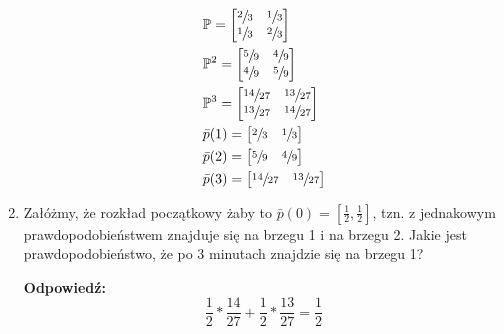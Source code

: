 \begin{enumerate}[label=\alph*)]
\begin{multicols}{2}
\begin{align*}
&\mathbb{P}=\begin{bmatrix}
\sfrac{2}{3}&\sfrac{1}{3}\\
\sfrac{1}{3}&\sfrac{2}{3}
\end{bmatrix}\\
&\mathbb{P}^2=\begin{bmatrix}
\sfrac{5}{9}&\sfrac{4}{9}\\
\sfrac{4}{9}&\sfrac{5}{9}
\end{bmatrix}\\
&\mathbb{P}^3=\begin{bmatrix}
\sfrac{14}{27}&\sfrac{13}{27}\\
\sfrac{13}{27}&\sfrac{14}{27}
\end{bmatrix}\\
&\bar{p}(1)=\begin{bmatrix}
\sfrac{2}{3}&\sfrac{1}{3}
\end{bmatrix}\\
&\bar{p}(2)=\begin{bmatrix}
\sfrac{5}{9}&\sfrac{4}{9}
\end{bmatrix}\\
&\bar{p}(3)=\begin{bmatrix}
\sfrac{14}{27}&\sfrac{13}{27}
\end{bmatrix}
\end{align*}
\end{multicols}
\item Załóżmy, że rozkład początkowy żaby to $\bar{p}(0) = \left[ \frac{1}{2}, \frac{1}{2}\right]$, tzn. z jednakowym prawdopodobieństwem znajduje się na brzegu 1 i na brzegu 2. Jakie jest prawdopodobieństwo, że po 3 minutach znajdzie się na brzegu 1?

\textbf{Odpowiedź: }
$$\frac{1}{2}*\frac{14}{27}+\frac{1}{2}*\frac{13}{27}=\frac{1}{2}$$
\end{enumerate}

